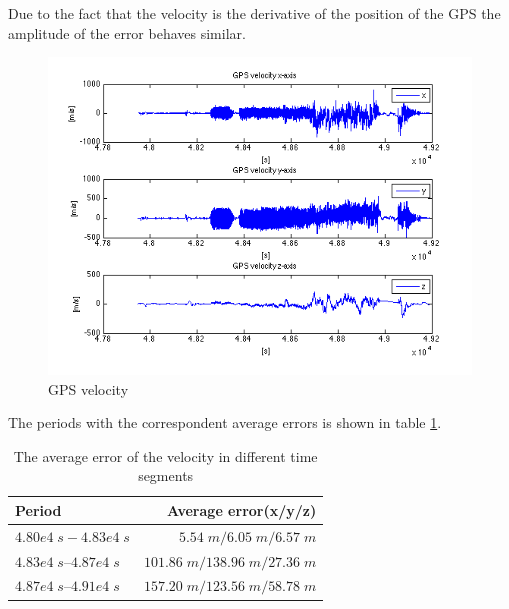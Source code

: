 Due to the fact that the velocity is the derivative of the position of the GPS the amplitude of the error behaves  similar.
\begin{figure}[hb]
\centering
\includegraphics[width=1\textwidth]{pictures/ct_vel.png}
\caption{GPS velocity}
\label{ct_vel}
\end{figure}
The periods with the correspondent average errors is shown in table \ref{ct_vel_error}.
\begin{table}[h]
\centering
\begin{tabular}{|l|r|}
\hline
Period & Average error(x/y/z) \\
\hline
$4.80e4\;s - 4.83e4\;s$&$5.54\;m / 6.05\;m / 6.57\;m$\\
\hline
$4.83e4\;s – 4.87e4\;s$&$101.86\;m / 138.96\;m/ 27.36\;m$\\
\hline
$4.87e4\;s – 4.91e4\;s$&$157.20\;m / 123.56\;m / 58.78\;m$\\
\hline
\end{tabular}
\caption{The average error of the velocity in different time segments}
\label{ct_vel_error}
\end{table}



